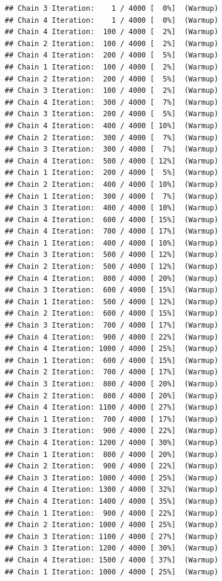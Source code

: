 \documentclass[
]{article}
\begin{document}
\begin{verbatim}
## Chain 3 Iteration:    1 / 4000 [  0%]  (Warmup) 
## Chain 4 Iteration:    1 / 4000 [  0%]  (Warmup) 
## Chain 4 Iteration:  100 / 4000 [  2%]  (Warmup) 
## Chain 2 Iteration:  100 / 4000 [  2%]  (Warmup) 
## Chain 4 Iteration:  200 / 4000 [  5%]  (Warmup) 
## Chain 1 Iteration:  100 / 4000 [  2%]  (Warmup) 
## Chain 2 Iteration:  200 / 4000 [  5%]  (Warmup) 
## Chain 3 Iteration:  100 / 4000 [  2%]  (Warmup) 
## Chain 4 Iteration:  300 / 4000 [  7%]  (Warmup) 
## Chain 3 Iteration:  200 / 4000 [  5%]  (Warmup) 
## Chain 4 Iteration:  400 / 4000 [ 10%]  (Warmup) 
## Chain 2 Iteration:  300 / 4000 [  7%]  (Warmup) 
## Chain 3 Iteration:  300 / 4000 [  7%]  (Warmup) 
## Chain 4 Iteration:  500 / 4000 [ 12%]  (Warmup) 
## Chain 1 Iteration:  200 / 4000 [  5%]  (Warmup) 
## Chain 2 Iteration:  400 / 4000 [ 10%]  (Warmup) 
## Chain 1 Iteration:  300 / 4000 [  7%]  (Warmup) 
## Chain 3 Iteration:  400 / 4000 [ 10%]  (Warmup) 
## Chain 4 Iteration:  600 / 4000 [ 15%]  (Warmup) 
## Chain 4 Iteration:  700 / 4000 [ 17%]  (Warmup) 
## Chain 1 Iteration:  400 / 4000 [ 10%]  (Warmup) 
## Chain 3 Iteration:  500 / 4000 [ 12%]  (Warmup) 
## Chain 2 Iteration:  500 / 4000 [ 12%]  (Warmup) 
## Chain 4 Iteration:  800 / 4000 [ 20%]  (Warmup) 
## Chain 3 Iteration:  600 / 4000 [ 15%]  (Warmup) 
## Chain 1 Iteration:  500 / 4000 [ 12%]  (Warmup) 
## Chain 2 Iteration:  600 / 4000 [ 15%]  (Warmup) 
## Chain 3 Iteration:  700 / 4000 [ 17%]  (Warmup) 
## Chain 4 Iteration:  900 / 4000 [ 22%]  (Warmup) 
## Chain 4 Iteration: 1000 / 4000 [ 25%]  (Warmup) 
## Chain 1 Iteration:  600 / 4000 [ 15%]  (Warmup) 
## Chain 2 Iteration:  700 / 4000 [ 17%]  (Warmup) 
## Chain 3 Iteration:  800 / 4000 [ 20%]  (Warmup) 
## Chain 2 Iteration:  800 / 4000 [ 20%]  (Warmup) 
## Chain 4 Iteration: 1100 / 4000 [ 27%]  (Warmup) 
## Chain 1 Iteration:  700 / 4000 [ 17%]  (Warmup) 
## Chain 3 Iteration:  900 / 4000 [ 22%]  (Warmup) 
## Chain 4 Iteration: 1200 / 4000 [ 30%]  (Warmup) 
## Chain 1 Iteration:  800 / 4000 [ 20%]  (Warmup) 
## Chain 2 Iteration:  900 / 4000 [ 22%]  (Warmup) 
## Chain 3 Iteration: 1000 / 4000 [ 25%]  (Warmup) 
## Chain 4 Iteration: 1300 / 4000 [ 32%]  (Warmup) 
## Chain 4 Iteration: 1400 / 4000 [ 35%]  (Warmup) 
## Chain 1 Iteration:  900 / 4000 [ 22%]  (Warmup) 
## Chain 2 Iteration: 1000 / 4000 [ 25%]  (Warmup) 
## Chain 3 Iteration: 1100 / 4000 [ 27%]  (Warmup) 
## Chain 3 Iteration: 1200 / 4000 [ 30%]  (Warmup) 
## Chain 4 Iteration: 1500 / 4000 [ 37%]  (Warmup) 
## Chain 1 Iteration: 1000 / 4000 [ 25%]  (Warmup) 

\end{verbatim}
\end{document}

